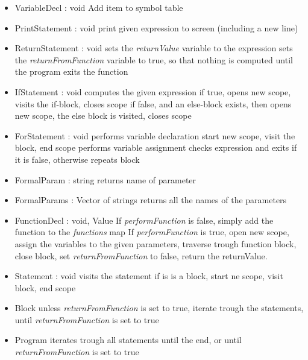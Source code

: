 \begin{itemize}
	\item VariableDecl : void
		\subitem Add item to symbol table
	\item PrintStatement : void
		\subitem print given expression to screen (including a new line)
	\item ReturnStatement : void
		\subitem sets the \textit{returnValue} variable to the expression
		\subitem sets the \textit{returnFromFunction} variable to true, so that nothing is computed until the program exits the function
	\item IfStatement : void
		\subitem computes the given expression
		\subitem if true, opens new scope, visits the if-block, closes scope
		\subitem if false, and an else-block exists, then opens new scope, the else block is visited, closes scope
	\item ForStatement : void
		\subitem performs variable declaration
		\subitem start new scope, visit the block, end scope
		\subitem performs variable assignment
		\subitem checks expression and exits if it is false, otherwise repeats block
	\item FormalParam : string
		\subitem returns name of parameter
	\item FormalParams : Vector of strings
		\subitem returns all the names of the parameters
	\item FunctionDecl : void, Value
		\subitem If \textit{performFunction} is false, simply add the function to the \textit{functions} map
		\subitem If \textit{performFunction} is true, open new scope, assign the variables to the given parameters, traverse trough function block, close block, set \textit{returnFromFunction} to false, return the returnValue.
	\item Statement : void
		\subitem visits the statement
		\subitem if is is a block, start ne scope, visit block, end scope
	\item Block
		\subitem unless \textit{returnFromFunction} is set to true, iterate trough the statements, until \textit{returnFromFunction} is set to true
	\item Program
		\subitem iterates trough all statements until the end, or until \textit{returnFromFunction} is set to true
\end{itemize}
